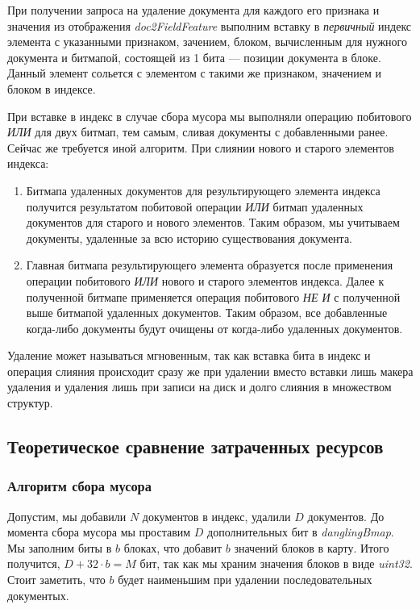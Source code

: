 При получении запроса на удаление документа для каждого его признака и
значения из отображения \textit{doc2FieldFeature} выполним вставку в
\textit{первичный} индекс элемента с указанными признаком, зачением, блоком,
вычисленным для нужного документа и битмапой, состоящей из 1 бита — позиции
документа в блоке. Данный элемент сольется с элементом с такими же признаком,
значением и блоком в индексе.

При вставке в индекс в случае сбора мусора мы выполняли операцию побитового
\textit{ИЛИ} для двух битмап, тем самым, сливая документы с добавленными ранее.
Сейчас же требуется иной алгоритм. При слиянии нового и старого элементов
индекса:
\begin{enumerate}
    \item Битмапа удаленных документов для результирующего элемента индекса
    получится результатом побитовой операции \textit{ИЛИ} битмап удаленных
    документов для старого и нового элементов. Таким образом, мы учитываем
    документы, удаленные за всю историю существования документа.
    \item Главная битмапа результирующего элемента образуется после применения
    операции побитового \textit{ИЛИ} нового и старого элементов индекса. Далее к 
    полученной битмапе применяется операция побитового \textit{НЕ И} с полученной
    выше битмапой удаленных документов. Таким образом, все добавленные когда-либо
    документы будут очищены от когда-либо удаленных документов. 
\end{enumerate}

Удаление может называться мгновенным, так как вставка бита в индекс и операция
слияния происходит сразу же при удалении вместо вставки лишь макера удаления и
удаления лишь при записи на диск и долго слияния в множеством структур.

\subsection{Теоретическое сравнение затраченных ресурсов}

\subsubsection{Алгоритм сбора мусора}

Допустим, мы добавили $N$ документов в индекс, удалили $D$ документов.
До момента сбора мусора мы проставим $D$ дополнительных бит в \textit{danglingBmap}.
Мы заполним биты в $b$ блоках, что добавит $b$ значений блоков в карту.
Итого получится, $D + 32\cdot b = M$ бит, так как мы
храним значения блоков в виде \textit{uint32}. Стоит заметить, что $b$ будет
наименьшим при удалении последовательных документых.


